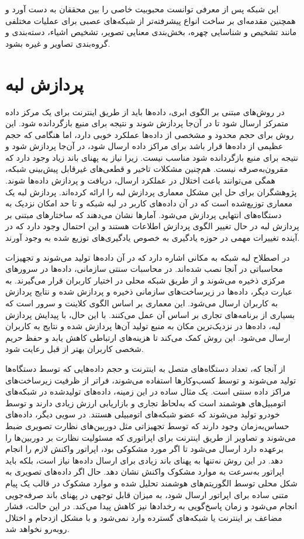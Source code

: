 این شبکه پس از معرفی توانست محبوبیت خاصی را بین محققان به دست آورد و همچنین مقدمه‌ای بر ساخت انواع پیشرفته‌تر از شبکه‌های عصبی برای عملیات مختلفی مانند تشخیص و شناسایی چهره، بخش‌بندی معنایی تصویر، تشخیص اشیاء، دسته‌بندی و گروه‌بندی تصاویر و غیره بشود.\cite{ref8}
\section{پردازش لبه}

در روش‌های مبتنی بر الگوی ابری، داده‌ها باید از طریق اینترنت برای یک مرکز داده متمرکز ارسال شود تا در آن‌جا پردازش شوند و نتیجه برای منبع بازگردانده شود. این روش برای حجم محدود و مشخصی از داده‌ها عملکرد خوبی دارد، اما هنگامی که حجم عظیمی از داده‌ها قرار باشد برای مراکز داده ارسال شود، در آن‌جا پردازش شود و نتیجه برای منبع بازگردانده شود مناسب نیست. زیرا نیاز به پهنای باند زیاد وجود دارد که مقرون‌به‌صرفه نیست. هم‌چنین مشکلات تاخیر و قطعی‌های غیرقابل پیش‌بینی شبکه، همگی می‌توانند باعث اختلال در عملکرد ارسال، دریافت و پردازش داده‌ها شوند. پژوهشگران برای حل این مشکل معماری پردازش لبه را ارائه کرده‌اند. پردازش لبه یک معماری توزیع‌شده است که در آن داده‌های کاربر در لبه شبکه و تا حد امکان نزدیک به دستگاه‌های انتهایی پردازش می‌شود. آمارها نشان می‌دهند که ساختار‌های مبتنی بر پردازش لبه در حال تغییر الگوی پردازش اطلاعات هستند و این احتمال وجود دارد که در آینده تغییرات مهمی در حوزه یادگیری به خصوص یادگیری‌های توزیع شده به وجود آورند\cite{edge1}.

در اصطلاح لبه شبکه به مکانی اشاره دارد که در آن داده‌ها تولید می‌شوند و تجهیزات محاسباتی در آنجا نصب شده‌اند. در محاسبات سنتی سازمانی، داده‌ها در سرورهای مرکزی ذخیره می‌شوند و از طریق شبکه محلی در اختیار کاربران قرار می‌گیرند. به عبارت دیگر، داده‌ها در زیرساخت‌های سازمانی ذخیره و پردازش شده و نتایج پردازش به کاربران ارسال می‌شود. این معماری بر اساس الگوی کلاینت و سرور است که بسیاری از برنامه‌های تجاری بر اساس آن عمل می‌کنند. با این حال، با پیدایش پردازش لبه، داده‌ها در نزدیک‌ترین مکان به منبع تولید آن‌ها پردازش شده و نتایج به کاربران ارسال می‌شود. این روش کمک می‌کند تا هزینه‌های ارتباطی کاهش یابد و حفظ حریم شخصی کاربران بهتر از قبل رعایت شود.

از آنجا که، تعداد دستگاه‌های متصل به اینترنت و حجم داده‌هایی که توسط دستگاه‌ها تولید می‌شوند و توسط کسب‌وکارها استفاده می‌شوند، فراتر از ظرفیت زیرساخت‌های مراکز داده سنتی است. یک مثال ساده در این زمینه، داده‌های تولیدشده در شبکه‌های اتومبیل‌های هوشمند است که به‌لحاظ تجاری و بازاریابی ارزش زیادی دارند و توسط خودرو تولید می‌شوند که عضو شبکه‌های اتومبیلی هستند. در سویی دیگر، داده‌های حساس‌به‌زمان وجود دارند که توسط تجهیزاتی مثل دوربین‌های نظارت تصویری ضبط می‌شوند و تصاویر از طریق اینترنت برای اپراتوری که مسئولیت نظارت بر دوربین‌ها را برعهده دارد ارسال می‌شود تا اگر مورد مشکوکی بود، اپراتور واکنش لازم را انجام دهد. در این روش نه‌تنها به پهنای باند زیادی برای ارسال داده‌ها نیاز است، بلکه باید اپراتور به‌سرعت به موارد مشکوک واکنش نشان دهد. حال اگر داده‌های تصویری به‌ شکل محلی توسط الگوریتم‌های هوشمند تحلیل شده و موارد مشکوک در قالب یک پیام متنی ساده برای اپراتور ارسال شود، به میزان قابل توجهی در پهنای باند صرفه‌جویی انجام می‌شود و زمان پاسخ‌گویی به رخدادها نیز کاهش پیدا می‌کند. در این حالت، فشار مضاعف بر اینترنت یا شبکه‌های گسترده وارد نمی‌شود و با مشکل ازدحام و اختلال روبه‌رو نخواهد شد.


